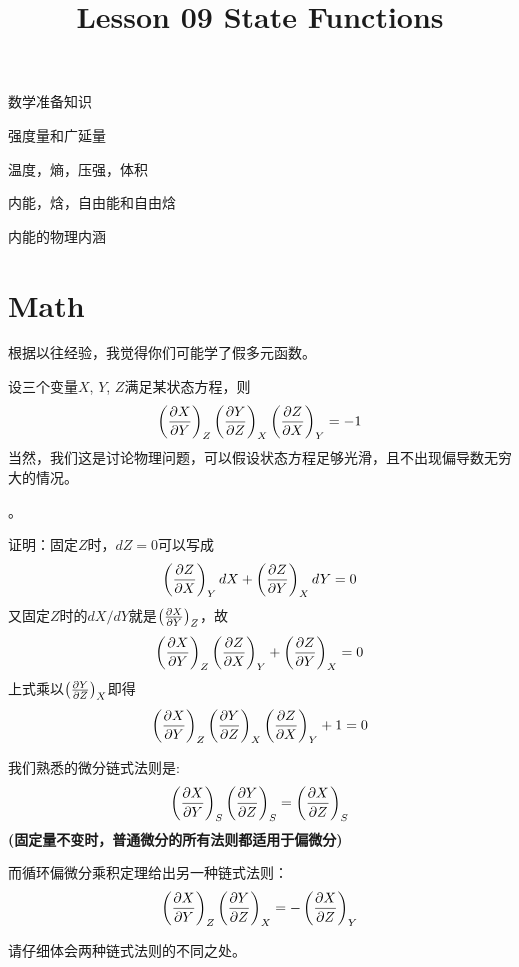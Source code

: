 \documentclass[CJK]{beamer}
\title{Lesson 09 State Functions}
\author{}
\date{}
\begin{document}


\begin{frame}
\bch
\bitem
\item{数学准备知识}
\item{强度量和广延量}
\item{温度，熵，压强，体积}
\item{内能，焓，自由能和自由焓}
\item{内能的物理内涵}
\eitem
\ech
\end{frame}

\section{Math}

\begin{frame}
\bch

根据以往经验，我觉得你们可能学了假多元函数。


\ech
\end{frame}

\begin{frame}
\bch
设三个变量$X$, $Y$, $Z$满足某状态方程，则
{\blue 
$$\pfrac XYZ  \pfrac YZX \pfrac ZXY = -1$$
}
当然，我们这是讨论物理问题，可以假设状态方程足够光滑，且不出现偏导数无穷大的情况。

\skipline

。
\ech
\end{frame}


\begin{frame}
\bch
{\scriptsize
证明：固定$Z$时，$dZ = 0$可以写成
$$\pfrac ZXY dX + \pfrac ZYX dY = 0$$
又固定$Z$时的$dX/dY$就是$\pfrac XYZ$，故
$$\pfrac XYZ \pfrac ZXY + \pfrac ZYX = 0$$
上式乘以$\pfrac YZX$即得
$$\pfrac XYZ \pfrac YZX \pfrac ZXY + 1 = 0$$
}
\ech
\end{frame}

\begin{frame}
\bch
我们熟悉的微分链式法则是:
$$\pfrac XYS \pfrac YZS = \pfrac XZS$$
{\small \bf (固定量不变时，普通微分的所有法则都适用于偏微分)}
 
\skipline

而循环偏微分乘积定理给出另一种链式法则：
$$\pfrac XYZ \pfrac YZX = -\pfrac XZY $$

\skiplines

请仔细体会两种链式法则的不同之处。
\ech
\end{frame}
\end{document}
